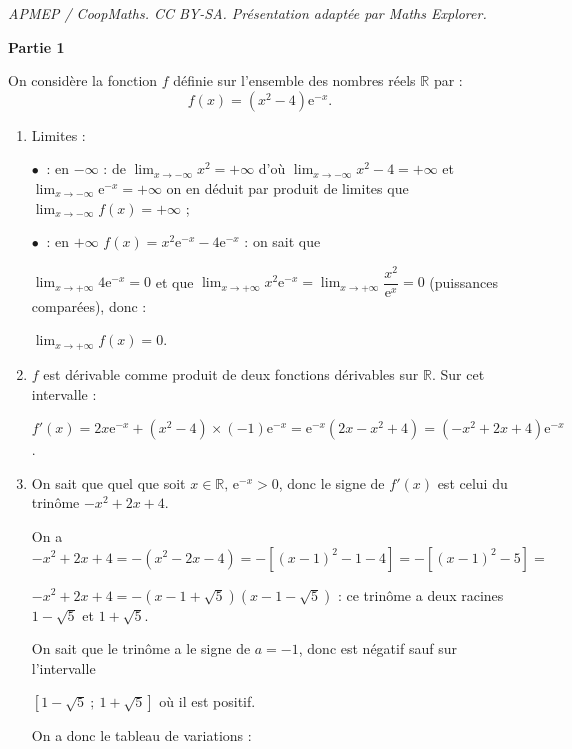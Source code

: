 \documentclass[10pt]{article}
\providecommand{\R}{\mathbb{R}}
\providecommand{\e}{{\mathrm{e}}}
\begin{document}
\noindent\textit{APMEP / CoopMaths. CC BY-SA. Présentation adaptée par Maths Explorer.}\par\medskip
\medskip

\textbf{Partie 1}

\medskip

On considère la fonction $f$ définie sur l'ensemble des nombres réels $\R$ par :
\[f(x) = \left(x^2 - 4\right)\e^{-x}.\]



\begin{enumerate}
\item Limites :

$\bullet~$ : en $- \infty$ : de $\displaystyle\lim_{x \to - \infty}x^2 = + \infty$ d'où 
$\displaystyle\lim_{x \to - \infty}x^2 - 4 = + \infty$ et $\displaystyle\lim_{x \to - \infty}\e^{-x} =
 + \infty$ on en déduit par produit de limites que $\displaystyle\lim_{x \to - \infty} f(x) = + \infty$ ;

$\bullet~$ : en $+ \infty$ $f(x) = x^2\e^{-x} - 4\e^{-x}$ : on sait que 

$\displaystyle\lim_{x \to + \infty}4\e^{-x} = 0$ et que $\displaystyle\lim_{x \to + \infty}x^2\e^{-x} = \displaystyle\lim_{x \to + \infty}\dfrac{x^2}{\e^x} =  0$ (puissances comparées), donc :

$\displaystyle\lim_{x \to + \infty} f(x) = 0$.
\item 
$f$ est dérivable comme produit de deux fonctions dérivables sur $\R$. Sur cet intervalle :

$f'(x) = 2x\e^{-x} + \left(x^2 - 4\right) \times (- 1)\e^{-x} = \e^{-x}(2x - x^2 + 4) = \left(- x^2 + 2x + 4\right)\e^{-x}$.
\item 
On sait que quel que soit $x \in\R,\, \e^{-x} > 0$, donc le signe de $f'(x)$ est celui du trinôme $- x^2 + 2x + 4$.

On a $- x^2 + 2x + 4 = -\left(x^2 - 2x - 4\right) = -\left[(x - 1)^2 - 1 - 4\right] = -\left[(x - 1)^2 - 5\right] =$

$- x^2 + 2x + 4 = - \left(x - 1 + \sqrt 5\right)\left(x - 1 - \sqrt 5\right)$ : ce trinôme a deux racines $1 - \sqrt 5$ et $1 + \sqrt 5$.

On sait que le trinôme a le signe de $a = -1$, donc est négatif sauf sur l'intervalle 

$\left[1 - \sqrt 5~;~1 + \sqrt 5\right]$ où il est positif.

On a donc le tableau de variations :


\end{enumerate}
\end{document}
